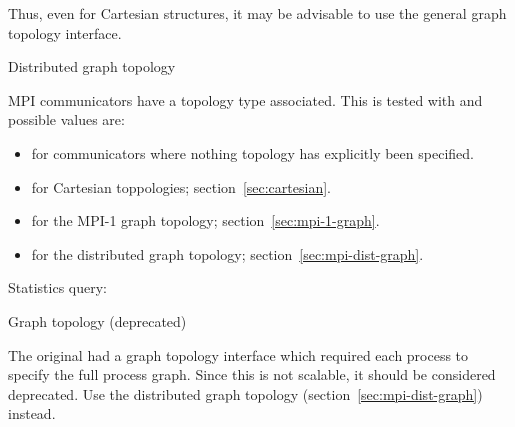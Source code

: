 Thus, even for Cartesian structures, it may be advisable to use the
general graph topology interface.

 {Distributed graph topology}
\label{sec:mpi-dist-graph}

MPI communicators have a topology type associated. This is tested with
%
%
and possible values are:
\begin{itemize}
\item {} for communicators where nothing
  topology has explicitly been specified.
\item {} for Cartesian toppologies;
  section~\ref{sec:cartesian}.
\item {} for the MPI-1 graph topology;
  section~\ref{sec:mpi-1-graph}.
\item {} for the distributed graph
  topology; section~\ref{sec:mpi-dist-graph}.
\end{itemize}


Statistics query:
%

 {Graph topology (deprecated)}
\label{sec:mpi-1-graph}

The original  had a graph topology interface
which required each process to specify the full process graph. Since
this is not scalable, it should be considered deprecated. Use the
distributed graph topology (section~\ref{sec:mpi-dist-graph}) instead.



